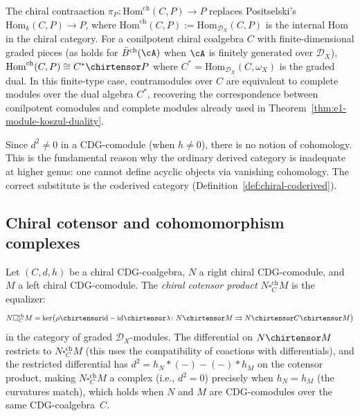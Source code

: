 \begin{remark}
\label{rem:chiral-contramodules}
The chiral contraaction $\pi_P\colon \mathrm{Hom}^{\mathrm{ch}}(C, P) \to P$
replaces Positselski's $\mathrm{Hom}_k(C, P) \to P$, where
$\mathrm{Hom}^{\mathrm{ch}}(C, P) := \mathrm{Hom}_{\mathcal{D}_X}(C, P)$
is the internal Hom in the chiral category.  For a conilpotent chiral
coalgebra $C$ with finite-dimensional graded pieces (as holds for
$\bar{B}^{\mathrm{ch}}(\cA)$ when $\cA$ is finitely generated over $\mathcal{D}_X$),
$\mathrm{Hom}^{\mathrm{ch}}(C, P) \cong C^* \chirtensor P$
where $C^* = \mathrm{Hom}_{\mathcal{D}_X}(C, \omega_X)$ is the
graded dual.  In this finite-type case, contramodules over $C$ are
equivalent to complete modules over the dual algebra $C^*$, recovering
the correspondence between conilpotent comodules and complete modules
already used in Theorem~\ref{thm:e1-module-koszul-duality}.
\end{remark}

\begin{remark}
\label{rem:no-CDG-cohomology}
Since $d^2 \neq 0$ in a CDG-comodule (when $h \neq 0$), there is no
notion of cohomology.  This is the fundamental reason why the ordinary
derived category is inadequate at higher genus: one cannot define
acyclic objects via vanishing cohomology.  The correct
substitute is the coderived category (Definition~\ref{def:chiral-coderived}).
\end{remark}

\subsection{Chiral cotensor and cohomomorphism complexes}
\label{subsec:chiral-cotensor}

\begin{definition}\label{def:chiral-cotensor}
Let $(C, d, h)$ be a chiral CDG-coalgebra, $N$ a right chiral
CDG-comodule, and $M$ a left chiral CDG-comodule.  The
\emph{chiral cotensor product} $N \square_C^{\mathrm{ch}} M$ is
the equalizer:
\[
N \square_C^{\mathrm{ch}} M =
\ker\bigl(\rho \chirtensor \mathrm{id} - \mathrm{id} \chirtensor \lambda\colon
N \chirtensor M \rightrightarrows N \chirtensor C \chirtensor M\bigr)
\]
in the category of graded $\mathcal{D}_X$-modules.
The differential on $N \chirtensor M$ restricts to
$N \square_C^{\mathrm{ch}} M$ (this uses the compatibility of coactions
with differentials), and the restricted differential has
$d^2 = h_N \ast (-) - (-) \ast h_M$ on the cotensor product, making
$N \square_C^{\mathrm{ch}} M$ a complex (i.e., $d^2 = 0$) precisely
when $h_N = h_M$ (the curvatures match), which holds when $N$ and $M$
are CDG-comodules over the same CDG-coalgebra~$C$.
\end{definition}

